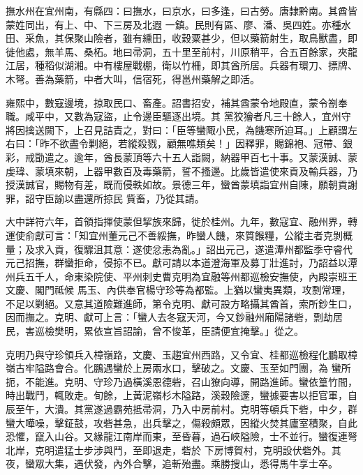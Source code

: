 
\begin{pinyinscope}

 撫水州在宜州南，有縣四：曰撫水，曰京水，曰多逢，曰古勞。唐隸黔南。其酋皆蒙姓同出，有上、中、下三房及北遐
 一鎮。民則有區、廖、潘、吳四姓。亦種水田、采魚，其保聚山險者，雖有纁田，收穀粟甚少，但以藥箭射生，取鳥獸盡，即徙他處，無羊馬、桑柘。地曰帚洞，五十里至前村，川原稍平，合五百餘家，夾龍江居，種稻似湖湘。中有樓屋戰棚，衛以竹柵，即其酋所居。兵器有環刀、摽牌、木弩。善為藥箭，中者大叫，信宿死，得邕州藥解之即活。



 雍熙中，數寇邊境，掠取民口、畜產。詔書招安，補其酋蒙令地殿直，蒙令劄奉職。咸平中，又數為寇盜，止令邊臣驅逐出境。其
 黨狡獪者凡三十餘人，宜州守將因擒送闕下，上召見詰責之，對曰：「臣等蠻陬小民，為饑寒所迫耳。」上顧謂左右曰：「昨不欲盡令剿絕，若縱殺戮，顧無噍類矣！」因釋罪，賜錦袍、冠帶、銀彩，戒勖遣之。逾年，酋長蒙頂等六十五人詣闕，納器甲百七十事。又蒙漢誠、蒙虔瑋、蒙填來朝，上器甲數百及毒藥箭，誓不搔邊。比歲皆遣使來貢及輸兵器，乃授漢誠官，賜物有差，既而侵軼如故。景德三年，蠻酋蒙填詣宜州自陳，願朝貢謝罪，詔守臣諭以盡還所掠民
 貲畜，乃從其請。



 大中詳符六年，首領指揮使蒙但挈族來歸，徙於桂州。九年，數寇宜、融州界，轉運使俞獻可言：「知宜州董元己不善綏撫，昨蠻人饑，來質餱糧，公縱主者克剝概量；及求入貢，復驟沮其意：遂使忿恚為亂。」詔出元己，遂遣潭州都監季守睿代元己招撫，群蠻拒命，侵掠不已。獻可請以本道澄海軍及募丁壯進討，乃詔益以潭州兵五千人，命東染院使、平州刺史曹克明為宜融等州都巡檢安撫使，內殿崇班王文慶、閣門祗候
 馬玉、內供奉官楊守珍等為都監。上猶以蠻夷異類，攻剽常理，不足以剿絕。又意其道險難進師，第令克明、獻可設方略攝其酋首，索所鈔生口，因而撫之。克明、獻可上言：「蠻人去冬寇天河，今又鈔融州廂陽諸砦，剽劫居民，害巡檢樊明，累依宣旨詔諭，曾不悛革，臣請便宜掩擊。」從之。



 克明乃與守珍領兵入樟嶺路，文慶、玉趨宜州西路，又令宜、桂都巡檢程化鵬取樟嶺古牢隘路會合。化鵬遇蠻於上房兩水口，擊破之。文慶、玉至如門團，為
 蠻所扼，不能進。克明、守珍乃過橫溪恩德砦，召山獠向導，開路進師。蠻依篁竹間，時出戰鬥，輒敗走。旬餘，上黃泥嶺杉木隘路，溪穀險邃，蠻據要害以拒官軍，自辰至午，大潰。其黨遂過霸苑抵帚洞，乃入中房前村。克明等頓兵下砦，中夕，群蠻大嘩噪，擊鉦鼓，攻砦甚急，出兵擊之，傷殺頗眾，因縱火焚其廬室積聚，自此恐懼，竄入山谷。又緣龍江南岸而東，至昏暮，過石峽隘險，士不並行。蠻復連弩北岸，克明遣猛士步涉與鬥，至即退走，砦於
 下房博賀村，克明設伏砦外。其夜，蠻眾大集，遇伏發，內外合擊，追斬殆盡。乘勝搜山，悉得馬牛享士卒。




\end{pinyinscope}
